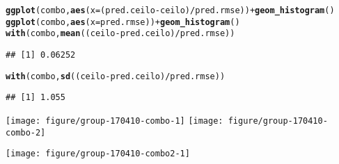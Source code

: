 \documentclass[10pt,notes=all,aspectratio=1610]{beamer}\usepackage[]{graphicx}\usepackage[]{color}
\makeatletter
\newcommand{\hlopt}[1]{\textcolor[rgb]{0,0,0}{#1}}%
\newcommand{\hlstd}[1]{\textcolor[rgb]{0.345,0.345,0.345}{#1}}%
\newcommand{\hlkwc}[1]{\textcolor[rgb]{0.333,0.667,0.333}{#1}}%
\newcommand{\hlkwd}[1]{\textcolor[rgb]{0.737,0.353,0.396}{\textbf{#1}}}%
\newenvironment{kframe}{%
 \def\at@end@of@kframe{}%
 \ifinner\ifhmode%
  \def\at@end@of@kframe{\end{minipage}}%
  \begin{minipage}{\columnwidth}%
 \fi\fi%
 \def\FrameCommand##1{\hskip\@totalleftmargin \hskip-\fboxsep
 \colorbox{shadecolor}{##1}\hskip-\fboxsep
     \hskip-\linewidth \hskip-\@totalleftmargin \hskip\columnwidth}%
 \MakeFramed {\advance\hsize-\width
   \@totalleftmargin\z@ \linewidth\hsize
   \@setminipage}}%
 {\par\unskip\endMakeFramed%
 \at@end@of@kframe}
\newenvironment{knitrout}{}{} %
\makeatother
\begin{document}
\begin{frame}[fragile]{\insertsection}
\begin{knitrout}
\color{fgcolor}\begin{kframe}
\begin{alltt}
\hlkwd{ggplot}\hlstd{(combo,} \hlkwd{aes}\hlstd{(}\hlkwc{x} \hlstd{= (pred.ceilo} \hlopt{-} \hlstd{ceilo)} \hlopt{/} \hlstd{pred.rmse))} \hlopt{+} \hlkwd{geom_histogram}\hlstd{()}
\hlkwd{ggplot}\hlstd{(combo,} \hlkwd{aes}\hlstd{(}\hlkwc{x} \hlstd{= pred.rmse))} \hlopt{+} \hlkwd{geom_histogram}\hlstd{()}
\hlkwd{with}\hlstd{(combo,} \hlkwd{mean}\hlstd{((ceilo} \hlopt{-} \hlstd{pred.ceilo)} \hlopt{/} \hlstd{pred.rmse))}
\end{alltt}
\begin{verbatim}
## [1] 0.06252
\end{verbatim}
\begin{alltt}
\hlkwd{with}\hlstd{(combo,} \hlkwd{sd}\hlstd{((ceilo} \hlopt{-} \hlstd{pred.ceilo)} \hlopt{/} \hlstd{pred.rmse))}
\end{alltt}
\begin{verbatim}
## [1] 1.055
\end{verbatim}
\end{kframe}

{\centering \texttt{[image: figure/group-170410-combo-1]} 
\texttt{[image: figure/group-170410-combo-2]} 

}



\end{knitrout}
\end{frame}

\begin{frame}[fragile]{\insertsection}
\begin{knitrout}
\color{fgcolor}

{\centering \texttt{[image: figure/group-170410-combo2-1]} 

}



\end{knitrout}
\end{frame}
\end{document}
